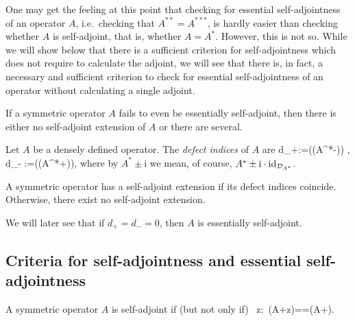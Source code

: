 \br
One may get the feeling at this point that checking for essential self-adjointness of an operator $A$, i.e.\ checking that $A^{**}=A^{***}$, is hardly easier than checking whether $A$ is self-adjoint, that is, whether $A=A^*$. However, this is not so. While we will show below that there is a sufficient criterion for self-adjointness which does not require to calculate the adjoint, we will see that there is, in fact, a necessary and sufficient criterion to check for essential self-adjointness of an operator without calculating a single adjoint.
\er

\br
If a symmetric operator $A$ fails to even be essentially self-adjoint, then there is either no self-adjoint extension of $A$ or there are several. 
\er

\bd
Let $A$ be a densely defined operator. The \emph{defect indices} of $A$ are
\bse
d_+:=\dim (\ker(A^*-)) , \qquad \quad d_- :=\dim (\ker (A^*+)),
\ese
where by $A^*\pm\mathrm{i}$ we mean, of course, $A^*\pm\mathrm{i}\cdot\operatorname{id}_{\mathcal{D}_{A^*}}$.
\ed

\bt
A symmetric operator has a self-adjoint extension if its defect indices coincide. Otherwise, there exist no self-adjoint extension.
\et

\br
We will later see that if $d_+=d_-=0$, then $A$ is essentially self-adjoint.
\er

\subsection{Criteria for self-adjointness and essential self-adjointness}


\bt
A symmetric operator $A$ is self-adjoint if (but not only if)
\bse
\exists \, z\in\C :\ \ran(A+z)==\ran(A+).
\ese
\et

